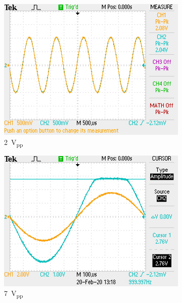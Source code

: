 \documentclass{report}
\newcommand{\pp}{_{pp}}
\newcommand{\Vpp}{\V\pp}
\begin{document}
\begin{figure}[h]
	\centering
	\begin{subfigure}{0.3\textwidth}
		\centering
		\includegraphics[width=\linewidth]{exp4_a}
		\caption{\SI{2}{\Vpp}}
		\label{fig:exp4a}
	\end{subfigure}
	\begin{subfigure}{0.3\textwidth}
		\centering
		\includegraphics[width=\linewidth]{exp4_b}
		\caption{\SI{7}{\Vpp}}
		\label{fig:exp4b}
	\end{subfigure}
	\begin{subfigure}{0.3\textwidth}
		\centering

\end{subfigure}
\end{figure}
\end{document}
